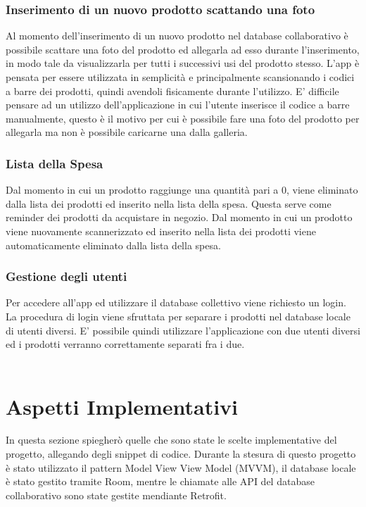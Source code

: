 \documentclass[11pt]{article}
\begin{document}
    \subsubsection{Inserimento di un nuovo prodotto scattando una foto}
    Al momento dell'inserimento di un nuovo prodotto nel database collaborativo è possibile scattare una foto del prodotto ed allegarla ad esso
    durante l'inserimento, in modo tale da visualizzarla per tutti i successivi usi del prodotto stesso. L'app è pensata per essere utilizzata in
    semplicità e principalmente scansionando i codici a barre dei prodotti, quindi avendoli fisicamente durante l'utilizzo. E' difficile pensare
    ad un utilizzo dell'applicazione in cui l'utente inserisce il codice a barre manualmente, questo è il motivo per cui è possibile fare una foto
    del prodotto per allegarla ma non è possibile caricarne una dalla galleria.
    \subsubsection{Lista della Spesa}
    Dal momento in cui un prodotto raggiunge una quantità pari a 0, viene eliminato dalla lista dei prodotti ed inserito nella lista della spesa.
    Questa serve come reminder dei prodotti da acquistare in negozio. Dal momento in cui un prodotto viene nuovamente scannerizzato ed inserito
    nella lista dei prodotti viene automaticamente eliminato dalla lista della spesa.
    \subsubsection{Gestione degli utenti}
    Per accedere all'app ed utilizzare il database collettivo viene richiesto un login. La procedura di login viene sfruttata per separare i prodotti
    nel database locale di utenti diversi. E' possibile quindi utilizzare l'applicazione con due utenti diversi ed i prodotti verranno correttamente 
    separati fra i due.\\ \\
    \section{Aspetti Implementativi}
    In questa sezione spiegherò quelle che sono state le scelte implementative del progetto, allegando degli snippet di codice. Durante 
    la stesura di questo progetto è stato utilizzato il pattern Model View View Model (MVVM), il database locale è stato gestito tramite Room, mentre le 
    chiamate alle API del database collaborativo sono state gestite mendiante Retrofit.
\end{document}
